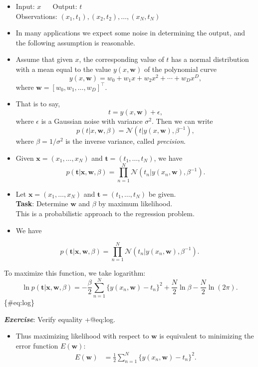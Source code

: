 \documentclass[
]{article}
\providecommand{\tightlist}{%
  \setlength{\itemsep}{0pt}\setlength{\parskip}{0pt}}
\begin{document}
\begin{itemize}
\item
  Input: \(x\) ~~ Output: \(t\)\\
  Observations: \((x_1,t_1), (x_2, t_2), \dots , (x_N, t_N)\)
\item
  In many applications we expect some noise in determining the output,
  and the following assumption is reasonable.
\item
  Assume that given \(x\), the corresponding value of \(t\) has a normal
  distribution with a mean equal to the value \(y(x, {\boldsymbol{w}})\)
  of the polynomial curve
  \[ y(x,{\boldsymbol{w}}) = w_0 +w_1 x + w_2 x^2 + \cdots + w_D x^D ,\]
  where \({\boldsymbol{w}}=[w_0, w_1, \dots , w_D]^\top\).
\item
  That is to say,\\
  \[ t=y(x,{\boldsymbol{w}})+\epsilon , \] where \(\epsilon\) is a
  Gaussian noise with variance \(\sigma^2\). Then we can write
  \[ p(t|x, {\boldsymbol{w}}, \beta) = \mathcal N(t|y(x, {\boldsymbol{w}}), \beta^{-1}), \]
  where \(\beta = 1/\sigma^2\) is the inverse variance, called
  \emph{precision}.
\item
  Given \({\boldsymbol{x}}=(x_1, \dots , x_N)\) and
  \(\mathbf{t}= (t_1, \dots , t_N)\), we have
  \[ p(\mathbf{t}|{\boldsymbol{x}}, {\boldsymbol{w}}, \beta) = \prod_{n=1}^N \mathcal N(t_n|y(x_n, {\boldsymbol{w}}), \beta^{-1}). \]
\item
  Let \({\boldsymbol{x}}=(x_1, \dots, x_N)\) and
  \(\mathbf{t}= (t_1,\dots, t_N)\) be given.\\
  \textbf{Task}: Determine \({\boldsymbol{w}}\) and \(\beta\) by maximum
  likelihood.\\
  This is a probabilistic approach to the regression problem.
\item
  We have
\end{itemize}

\[ p(\mathbf{t}|{\boldsymbol{x}}, {\boldsymbol{w}}, \beta) = \prod_{n=1}^N \mathcal N(t_n|y(x_n, {\boldsymbol{w}}), \beta^{-1}). \]

To maximize this function, we take logarithm:
\[ \ln p(\mathbf{t}|{\boldsymbol{x}}, {\boldsymbol{w}}, \beta) = -\frac \beta 2 \sum_{n=1}^N \{ y(x_n, {\boldsymbol{w}})-t_n \}^2 + \frac N 2 \ln \beta - \frac N 2 \ln (2 \pi) .\]\{\#eq:log\}

\textbf{\emph{Exercise}}: Verify equality +@eq:log.

\begin{itemize}
\tightlist
\item
  Thus maximizing likelihood with respect to \({\boldsymbol{w}}\) is
  equivalent to minimizing the error function \(E({\boldsymbol{w}})\):
  \begin{align*} E({\boldsymbol{w}})&=\tfrac 1 2 \sum_{n=1}^N \{ y(x_n, {\boldsymbol{w}})-t_n \}^2 . \end{align*}
\end{itemize}
\end{document}
